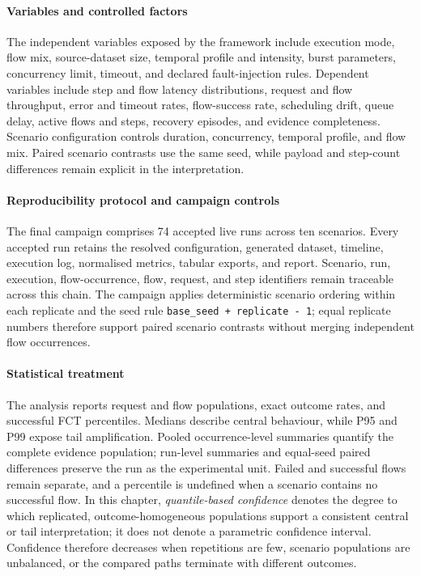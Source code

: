 \paragraph{Variables and controlled factors}
\noindent The independent variables exposed by the framework include execution mode,
flow mix, source-dataset size, temporal profile and intensity, burst parameters,
concurrency limit, timeout, and declared fault-injection rules. Dependent
variables include step and flow latency distributions, request and flow
throughput, error and timeout rates, flow-success rate, scheduling drift,
queue delay, active flows and steps, recovery episodes, and evidence
completeness. Scenario configuration controls duration, concurrency,
temporal profile, and flow mix. Paired scenario contrasts use the same seed,
while payload and step-count differences remain explicit in the interpretation.

\paragraph{Reproducibility protocol and campaign controls}
\noindent The final campaign comprises 74 accepted live runs across ten scenarios.
Every accepted run retains the resolved configuration, generated dataset,
timeline, execution log, normalised metrics, tabular exports, and report.
Scenario, run, execution, flow-occurrence, flow, request, and step identifiers
remain traceable across this chain. The campaign applies deterministic scenario
ordering within each replicate and the seed rule
\texttt{base\_seed + replicate - 1}; equal replicate numbers therefore support
paired scenario contrasts without merging independent flow occurrences.

\paragraph{Statistical treatment}
\noindent The analysis reports request and flow populations, exact outcome rates, and
successful FCT percentiles. Medians describe central behaviour, while P95
and P99 expose tail amplification. Pooled occurrence-level summaries quantify
the complete evidence population; run-level summaries and equal-seed paired
differences preserve the run as the experimental unit. Failed and successful
flows remain separate, and a percentile is undefined when a scenario contains
no successful flow. In this chapter, \emph{quantile-based confidence} denotes
the degree to which replicated, outcome-homogeneous populations support a
consistent central or tail interpretation; it does not denote a parametric
confidence interval. Confidence therefore decreases when repetitions are few,
scenario populations are unbalanced, or the compared paths terminate with
different outcomes.

